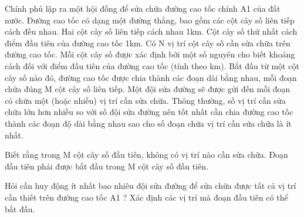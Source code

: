 Chính phủ lập ra một hội đồng để sửa chữa đường cao tốc chính       A1      của đất nước. Đường cao tốc có dạng một đường thẳng, bao gồm các cột cây số liên tiếp cách đều nhau. Hai cột cây số liên   tiếp cách nhau 1km. Cột cây số thứ nhất cách điểm đầu tiên của đường cao tốc 1km. Có N vị trí cột cây số cần sửa chữa trên đường cao tốc. Mỗi cột cây số được xác định bởi một số nguyên cho biết   khoảng cách đối với điểm đầu tiên của đường cao tốc (tính theo km). Bắt đầu từ một cột cây số nào đó, đường cao tốc được chia thành các đoạn dài bằng nhau, mỗi đoạn chứa đúng M cột cây số liên tiếp.   Một đội sửa đường sẽ được gửi đến mỗi đoạn có chứa một (hoặc nhiều) vị trí cần sửa chữa. Thông thường, số vị trí cần sửa chữa lớn hơn nhiều so với số đội sửa đường nên tốt nhất cần chia đường cao tốc   thành các đoạn độ dài bằng nhau sao cho số đoạn chứa vị trí cần sửa chữa là ít nhất.  

   Biết rằng trong M cột cây số đầu tiên, không có vị trí nào cần sửa chữa. Đoạn đầu tiên phải được bắt đầu trong M cột cây số đầu tiên.  

   Hỏi cần huy động ít nhất bao nhiêu đội sửa đường để sửa chữa được tất cả vị trí cần thiết trên đường cao tốc       A1      ? Xác định các vị trí mà đoạn đầu tiên có thể bắt đầu.